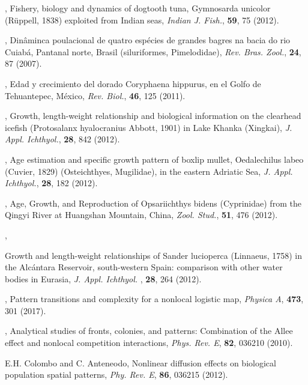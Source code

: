 \documentclass[12pt]{iopart}
\begin{document}
\begin{thebibliography}{100}
, {Fishery, biology and dynamics of dogtooth tuna, Gymnosarda unicolor (R\"{u}ppell, 1838) exploited from Indian seas}, \textit{Indian J. Fish.}, \textbf{59}, {75} {(2012)}.

, {Din\^{a}minca poulacional de quatro esp\'{e}cies de grandes bagres na bacia do rio Cuiab\'{a}, Pantanal norte, Brasil (siluriformes, Pimelodidae)}, \textit{ Rev. Bras. Zool.}, \textbf{24}, 87 {(2007)}.

, {Edad y crecimiento del dorado Coryphaena hippurus, en el Golfo de Tehuantepec, M\'{e}xico}, \textit{Rev. Biol.}, \textbf{46}, 125 {(2011)}.

, {Growth, length-weight relationship and biological information on the clearhead icefish (Protosalanx hyalocranius Abbott, 1901) in Lake Khanka (Xingkai)}, \textit{J. Appl. Ichthyol.}, \textbf{28}, 842 {(2012)}.

, {Age estimation and specific growth pattern of boxlip mullet, Oedalechilus labeo (Cuvier, 1829) (Osteichthyes, Mugilidae), in the eastern Adriatic Sea}, \textit{J. Appl. Ichthyol.}, \textbf{28}, 182 (2012).

, {Age, Growth, and Reproduction of Opsariichthys bidens (Cyprinidae) from the Qingyi River at Huangshan Mountain, China}, \textit{Zool. Stud.}, \textbf{51}, 476 {(2012)}.

, {Growth and length-weight relationships of Sander lucioperca (Linnaeus, 1758) in the Alc{\'{a}ntara Reservoir, south-western Spain: comparison with other water bodies in Eurasia}, \textit{J. Appl. Ichthyol. }, \textbf{28}, 264 {(2012)}.

, {Pattern transitions and complexity for a nonlocal logistic map}, \textit{Physica A}, \textbf{473}, {301} {(2017)}.

, {Analytical studies of fronts, colonies, and patterns: Combination of the Allee effect and nonlocal competition interactions}, \textit{Phys. Rev. E}, \textbf{82}, {036210} {(2010)}.

 {E.H. Colombo and C. Anteneodo}, {Nonlinear diffusion effects on biological population spatial patterns},  \textit{Phy. Rev. E}, \textbf{86}, 036215 (2012). 

}
\end{thebibliography}
\end{document}
